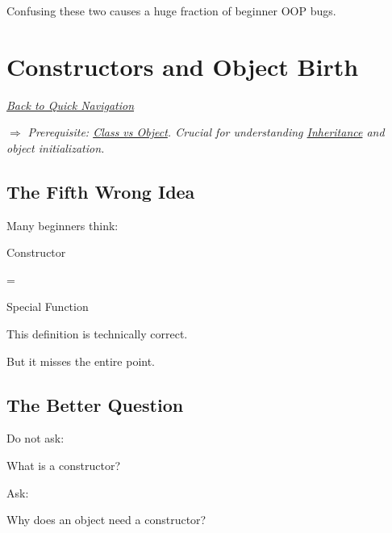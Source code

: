 \documentclass[11pt,a4paper]{book}
\begin{document}
Confusing these two causes
a huge fraction of beginner OOP bugs.

\chapter{Constructors and Object Birth}\label{chap:constructors}

\smallskip
\noindent
\hyperref[sec:quick_nav]{\emph{Back to Quick Navigation}}

\smallskip
\noindent
\textcolor{RosettaRoyalPurple}{$\Rightarrow$}
\emph{Prerequisite: \hyperref[chap:class_vs_object]{Class vs Object}. Crucial for understanding \hyperref[chap:inheritance]{Inheritance} and object initialization.}


\section{The Fifth Wrong Idea}

\begin{trap}

Many beginners think:

Constructor

=

Special Function

This definition is technically correct.

But it misses the entire point.

\end{trap}


\section{The Better Question}

Do not ask:

\begin{center}
What is a constructor?
\end{center}

Ask:

\begin{center}
Why does an object need a constructor?
\end{center}

\end{document}
